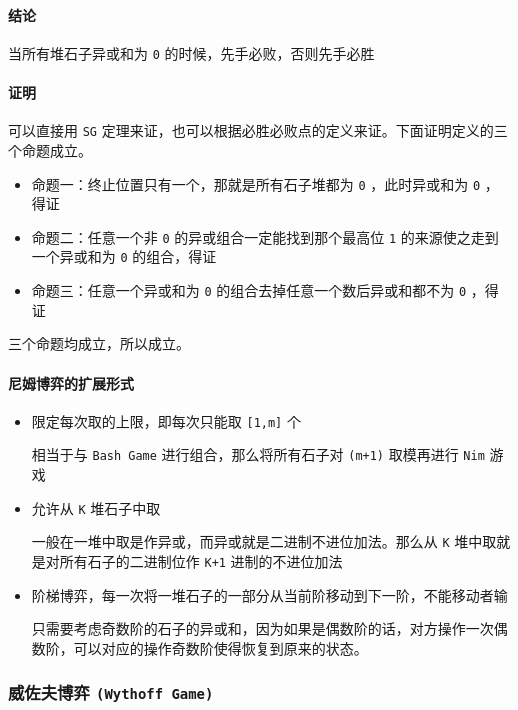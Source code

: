 \documentclass[UTF-8]{ctexart}
\begin{document}
	\paragraph{结论} 当所有堆石子异或和为 \texttt{0} 的时候，先手必败，否则先手必胜
	\paragraph{证明} 可以直接用 \texttt{SG} 定理来证，也可以根据必胜必败点的定义来证。下面证明定义的三个命题成立。
	
	\begin{itemize}
		\item 命题一：终止位置只有一个，那就是所有石子堆都为 \texttt{0} ，此时异或和为 \texttt{0} ，得证  
		\item 命题二：任意一个非 \texttt{0} 的异或组合一定能找到那个最高位 \texttt{1} 的来源使之走到一个异或和为 \texttt{0} 的组合，得证  
		\item 命题三：任意一个异或和为 \texttt{0} 的组合去掉任意一个数后异或和都不为 \texttt{0} ，得证  
	\end{itemize}
	三个命题均成立，所以成立。
	
	\paragraph{尼姆博弈的扩展形式}
	\begin{itemize}
		\item 限定每次取的上限，即每次只能取 \texttt{[1,m]} 个
	
		相当于与 \texttt{Bash Game} 进行组合，那么将所有石子对 \texttt{(m+1)} 取模再进行 \texttt{Nim} 游戏
	
		\item 允许从 \texttt{K} 堆石子中取
	
		一般在一堆中取是作异或，而异或就是二进制不进位加法。那么从 \texttt{K} 堆中取就是对所有石子的二进制位作 \texttt{K+1} 进制的不进位加法
	
		\item 阶梯博弈，每一次将一堆石子的一部分从当前阶移动到下一阶，不能移动者输
	
		只需要考虑奇数阶的石子的异或和，因为如果是偶数阶的话，对方操作一次偶数阶，可以对应的操作奇数阶使得恢复到原来的状态。
	\end{itemize}
	
	\subsubsection{威佐夫博弈 \texttt{(Wythoff Game)}}
\end{document}
